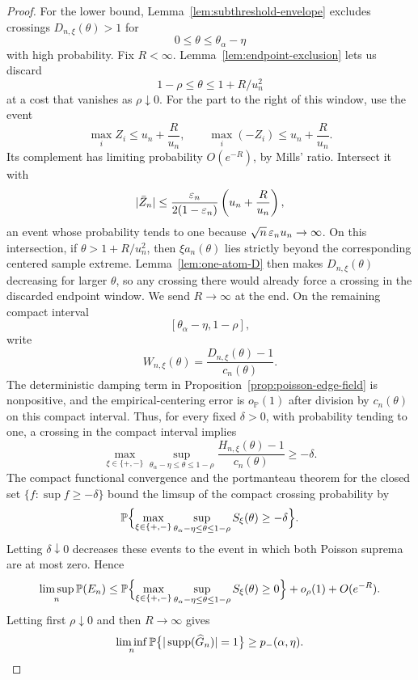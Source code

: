 \begin{proof}
For the lower bound, Lemma~\ref{lem:subthreshold-envelope} excludes crossings
\(D_{n,\xi}(\theta)>1\) for
\[
    0\le\theta\le\theta_\alpha-\eta
\]
with high probability. Fix $R<\infty$. Lemma~\ref{lem:endpoint-exclusion} lets us discard
\[
    1-\rho\le\theta\le1+R/u_n^2
\]
at a cost that vanishes as $\rho\downarrow0$. For the part to the right of this window, use the event
\[
    \max_i Z_i\le u_n+\frac{R}{u_n},
    \qquad
    \max_i(-Z_i)\le u_n+\frac{R}{u_n}.
\]
Its complement has limiting probability $O(e^{-R})$, by Mills' ratio.
Intersect it with
\[
 |\bar Z_n|
 \le
 \frac{\varepsilon_n}{2(1-\varepsilon_n)}
 \left(u_n+\frac R{u_n}\right),
\]
an event whose probability tends to one because
\(\sqrt n\,\varepsilon_nu_n\to\infty\). On this intersection, if
\(\theta>1+R/u_n^2\), then \(\xi a_n(\theta)\) lies strictly beyond the
corresponding centered sample extreme. Lemma~\ref{lem:one-atom-D} then makes
\(D_{n,\xi}(\theta)\) decreasing for larger \(\theta\), so any crossing there
would already force a crossing in the discarded endpoint window. We send
\(R\to\infty\) at the end. On the remaining compact interval
\[
    [\theta_\alpha-\eta,1-\rho],
\]
write
\[
    W_{n,\xi}(\theta)
    =
    \frac{D_{n,\xi}(\theta)-1}{c_n(\theta)}.
\]
The deterministic damping term in Proposition~\ref{prop:poisson-edge-field} is nonpositive, and the empirical-centering error is $o_{\mathbb P}(1)$ after division by $c_n(\theta)$ on this compact interval. Thus, for every fixed $\delta>0$, with probability tending to one, a crossing in the compact interval implies
\[
    \max_{\xi\in\{+,-\}}
    \sup_{\theta_\alpha-\eta\le\theta\le1-\rho}
    \frac{H_{n,\xi}(\theta)-1}{c_n(\theta)}
    \ge-\delta.
\]
The compact functional convergence and the portmanteau theorem for the closed
set $\{f:\sup f\ge-\delta\}$ bound the limsup of the compact crossing
probability by
\[
    \mathbb P\Bigl\{
        \max_{\xi\in\{+,-\}}
        \sup_{\theta_\alpha-\eta\le\theta\le1-\rho}
        S_\xi(\theta)\ge-\delta
    \Bigr\}.
\]
Letting \(\delta\downarrow0\) decreases these events to the event in which
both Poisson suprema are at most zero. Hence
\[
    \limsup_n
    \mathbb P(E_n)
    \le
    \mathbb P\Bigl\{
        \max_{\xi\in\{+,-\}}
        \sup_{\theta_\alpha-\eta\le\theta\le1-\rho}
        S_\xi(\theta)\ge0
    \Bigr\}
    +o_\rho(1)+O(e^{-R}).
\]
Letting first $\rho\downarrow0$ and then $R\to\infty$ gives
\[
    \liminf_n
    \mathbb P\bigl\{|\operatorname{supp}(\widehat G_n)|=1\bigr\}
    \ge
    p_-(\alpha,\eta).
\]


\end{proof}
